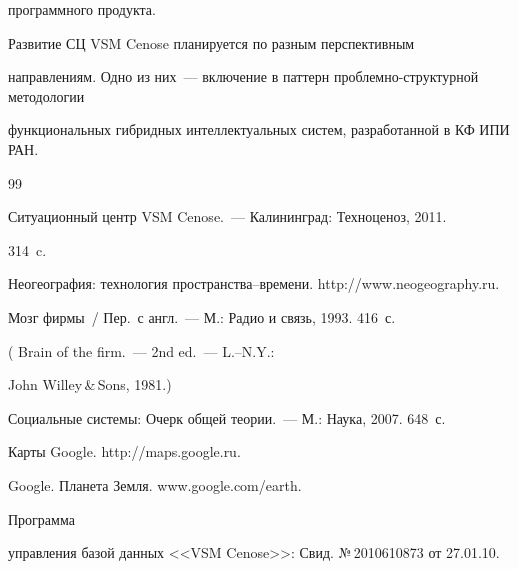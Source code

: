 программного продукта.


  


  Развитие СЦ VSM Cenose планируется по разным перспективным 


направлениям. Одно из них~--- включение в паттерн проб\-лем\-но-струк\-тур\-ной методологии 


функциональных гибридных интеллектуальных сис\-тем, разработанной в КФ ИПИ РАН.





 {\small\frenchspacing


{%




\begin{thebibliography}{99}


  




 Ситуационный центр VSM Cenose.~--- Калининград: Техноценоз, 2011. 


314~c.




Неогеография: технология пространства--вре\-ме\-ни. {\sf http://www.neogeography.ru}.




 Мозг фирмы~/ Пер.\ с англ.~--- М.: Радио и связь, 1993. 416~с.


( Brain of the firm.~--- 2nd ed.~--- L.--N.Y.:


John Willey\,\&\,Sons, 1981.)







 Социальные сис\-те\-мы: Очерк общей теории.~--- М.: Наука, 2007. 648~с.




Карты Google. {\sf http://maps.google.ru}.




Google. Планета Земля. {\sf www.google.com/earth}.




 Программа 


управления базой данных <<VSM Cenose>>: Свид. №\,2010610873 от 27.01.10.



\end{thebibliography}}}
